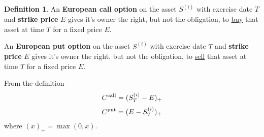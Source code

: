 \documentclass[a4paper,11pt, twoside]{book}
\theoremstyle{definition}
\newtheorem{mydef}{Definition}[chapter]
\theoremstyle{remark}
\begin{document}
\begin{mydef}
 An \textbf{European call option} on the asset $S^{(i)}$ with exercise date $T$ and \textbf{strike price} $E$ gives it's owner the right, but not the obligation, to \underline{buy} that asset at time $T$ for a fixed price $E$.
 
 An \textbf{European put option} on the asset $S^{(i)}$ with exercise date $T$ and \textbf{strike price} $E$ gives it's owner the right, but not the obligation, to \underline{sell} that asset at time $T$ for a fixed price $E$.
\end{mydef}
From the definition
\begin{equation}
 \label{eq:ecall}
 C\textsuperscript{call} = (S^{(i)}_T - E)_+
\end{equation}
\begin{equation}
 \label{eq:eput}
 C\textsuperscript{put} = (E - S^{(i)}_T )_+
\end{equation}
where $(x)_+ = \max(0,x)$.
\end{document}
